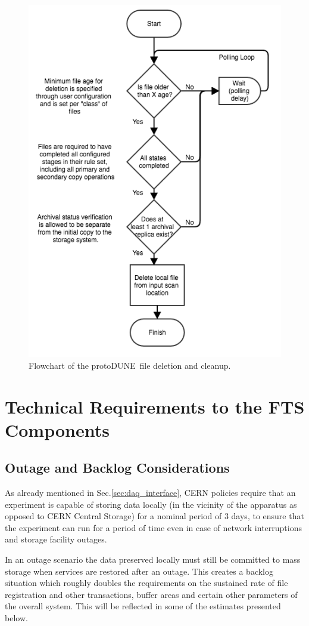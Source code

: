 \documentclass[pdftex,12pt,letter]{article}
\newcommand{\pd}{protoDUNE\ }
\begin{document}
\begin{figure}[tbh]
  \centering
  \includegraphics[width=0.55\linewidth]{fts_file_deletion_flowchart.png}  
  \caption{Flowchart of the \pd file deletion and cleanup.}
  \label{fig:ftscleanup}
\end{figure}


 
\section{Technical Requirements to the FTS Components}

\subsection{Outage and Backlog Considerations}
\label{sec:backlog}
As already mentioned in Sec.\ref{sec:daq_interface},
CERN policies require that an experiment is capable of storing data locally (in the vicinity of the apparatus as opposed to CERN Central
Storage)  for a nominal period of 3 days, to ensure that the experiment can run for a period of time even in case of network interruptions
and storage facility outages.

In an outage scenario the data preserved locally must still be committed to mass storage when services are
restored after an outage. This creates a backlog situation which roughly doubles the requirements on the sustained
rate of file registration and other transactions, buffer areas and certain other parameters of the overall system.
This will be reflected in some of the estimates presented below.
\end{document}
